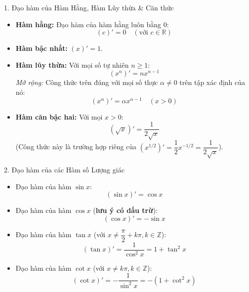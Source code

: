 \documentclass[12pt, a4paper]{article}
\begin{document}
\begin{pedabox}{1. Đạo hàm của Hàm Hằng, Hàm Lũy thừa \& Căn thức}
\begin{itemize}[leftmargin=0.5cm]
    \item \textbf{Hàm hằng:} Đạo hàm của hàm hằng luôn bằng $0$:
    \begin{equation}
        (c)' = 0 \quad (\text{với } c \in \mathbb{R})
    \end{equation}
    \item \textbf{Hàm bậc nhất:} $(x)' = 1$.
    \item \textbf{Hàm lũy thừa:} Với mọi số tự nhiên $n \geq 1$:
    \begin{equation}
        (x^n)' = n x^{n-1}
    \end{equation}
    \textit{Mở rộng:} Công thức trên đúng với mọi số thực $\alpha \neq 0$ trên tập xác định của nó:
    \begin{equation}
        (x^\alpha)' = \alpha x^{\alpha - 1} \quad (x > 0)
    \end{equation}
    \item \textbf{Hàm căn bậc hai:} Với mọi $x > 0$:
    \begin{equation}
        (\sqrt{x})' = \dfrac{1}{2\sqrt{x}}
    \end{equation}
    (Công thức này là trường hợp riêng của $(x^{1/2})' = \dfrac{1}{2} x^{-1/2} = \dfrac{1}{2\sqrt{x}}$).
\end{itemize}
\end{pedabox}

\begin{pedabox}{2. Đạo hàm của các Hàm số Lượng giác}
\begin{itemize}[leftmargin=0.5cm]
    \item Đạo hàm của hàm $\sin x$:
    \begin{equation}
        (\sin x)' = \cos x
    \end{equation}
    \item Đạo hàm của hàm $\cos x$ (\textbf{lưu ý có dấu trừ}):
    \begin{equation}
        (\cos x)' = -\sin x
    \end{equation}
    \item Đạo hàm của hàm $\tan x$ (với $x \neq \dfrac{\pi}{2} + k\pi, k \in \mathbb{Z}$):
    \begin{equation}
        (\tan x)' = \dfrac{1}{\cos^2 x} = 1 + \tan^2 x
    \end{equation}
    \item Đạo hàm của hàm $\cot x$ (với $x \neq k\pi, k \in \mathbb{Z}$):
    \begin{equation}
        (\cot x)' = -\dfrac{1}{\sin^2 x} = -(1 + \cot^2 x)
    \end{equation}
\end{itemize}
\end{pedabox}
\end{document}
